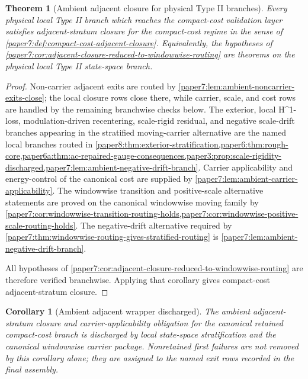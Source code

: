\documentclass[11pt]{amsart}
\def\({}%
\def\){}%
\theoremstyle{plain}
\newtheorem{theorem}{Theorem}[section]
\newtheorem{corollary}[corollary]{Corollary}
\theoremstyle{definition}
\theoremstyle{remark}
\begin{document}
\begin{theorem}[Ambient adjacent closure for physical Type II branches]
\label{paper7:thm:ambient-adjacent-closure-branchwise}
Every physical local Type II branch which reaches the compact-cost validation
layer satisfies adjacent-stratum closure for the compact-cost regime in the
sense of \cref{paper7:def:compact-cost-adjacent-closure}.  Equivalently, the
hypotheses of
\cref{paper7:cor:adjacent-closure-reduced-to-windowwise-routing} are theorems
on the physical local Type II state-space branch.
\end{theorem}

\begin{proof}
Non-carrier adjacent exits are routed by
\cref{paper7:lem:ambient-noncarrier-exits-close}; the local closure rows close
there, while carrier, scale, and cost rows are handled by the remaining
branchwise checks below.  The exterior,
local \(H^1\)-loss, modulation-driven recentering, scale-rigid residual, and
negative scale-drift branches appearing in the stratified moving-carrier
alternative are the named local branches routed in
\cref{paper8:thm:exterior-stratification,paper6:thm:rough-core,paper6a:thm:ac-repaired-gauge-consequences,paper3:prop:scale-rigidity-discharged,paper7:lem:ambient-negative-drift-branch}.
Carrier applicability and energy-control of the canonical cost are supplied by
\cref{paper7:lem:ambient-carrier-applicability}.  The windowwise transition
and positive-scale alternative statements are proved on the canonical
windowwise moving family by
\cref{paper7:cor:windowwise-transition-routing-holds,paper7:cor:windowwise-positive-scale-routing-holds}.
The negative-drift
alternative required by
\cref{paper7:thm:windowwise-routing-gives-stratified-routing} is
\cref{paper7:lem:ambient-negative-drift-branch}.
\par
All hypotheses of
\cref{paper7:cor:adjacent-closure-reduced-to-windowwise-routing} are therefore
verified branchwise.  Applying that corollary gives compact-cost
adjacent-stratum closure.
\end{proof}

\begin{corollary}[Ambient adjacent wrapper discharged]
\label{paper7:cor:ambient-adjacent-wrapper-discharged}
The ambient adjacent-stratum closure and carrier-applicability obligation for
the canonical retained compact-cost branch is discharged by local state-space
stratification and the canonical windowwise carrier package.  Nonretained first
failures are not removed by this corollary alone; they are assigned to the named
exit rows recorded in the final assembly.
\end{corollary}
\end{document}
